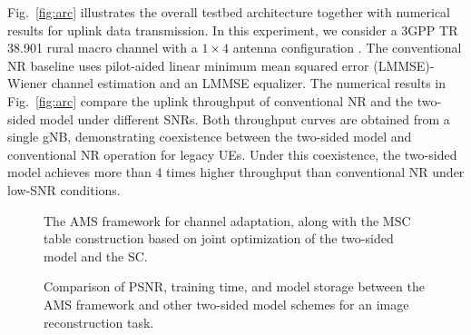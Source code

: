 \documentclass[10pt,twocolumn]{IEEEtran}
\begin{document}
Fig.~\ref{fig:arc} illustrates the overall testbed architecture together with numerical results for uplink data transmission. In this experiment, we consider a 3GPP TR 38.901 rural macro channel with a $1\times 4$ antenna configuration \cite{3gpp38901}. The conventional NR baseline uses pilot-aided linear minimum mean squared error (LMMSE)-Wiener channel estimation and an LMMSE equalizer. The numerical results in Fig.~\ref{fig:arc} compare the uplink throughput of conventional NR and the two-sided model under different SNRs. Both throughput curves are obtained from a single gNB, demonstrating coexistence between the two-sided model and conventional NR operation for legacy UEs. Under this coexistence, the two-sided model achieves more than $4$ times higher throughput than conventional NR under low-SNR conditions.








\begin{figure}[t]
    \centering
    {}\vspace{-2mm}
    \caption{The AMS framework for channel adaptation, along with the MSC table construction based on joint optimization of the two-sided model and the SC.}\label{fig:FCQ}%
\end{figure}


\begin{figure}[t]
    \centering
    {}\vspace{-2mm}
    \caption{Comparison of PSNR, training time, and model storage between the AMS framework and other two-sided model schemes for an image reconstruction task.}\label{fig:Simul_1}\vspace{-3mm}
\end{figure}
\end{document}
